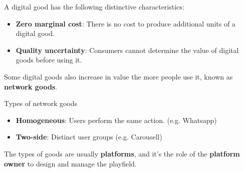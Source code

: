 A digital good has the following distinctive characteristics:

\begin{itemize}
    \item \textbf{Zero marginal cost}: There is no cost to produce additional units of a digital good.
    \item \textbf{Quality uncertainty}: Consumers cannot determine the value of digital goods before using it.
\end{itemize}

Some digital goods also increase in value the more people use it, known as \textbf{network goods}.

\begin{definition}
    {Types of network goods}
    \begin{itemize}
        \item \textbf{Homogeneous}: Users perform the same action. (e.g. Whatsapp)
        \item \textbf{Two-side}: Distinct user groups (e.g. Carousell)
    \end{itemize}
    The types of goods are usually \textbf{platforms}, and it's the role of the \textbf{platform owner} to design and manage the playfield.
\end{definition}